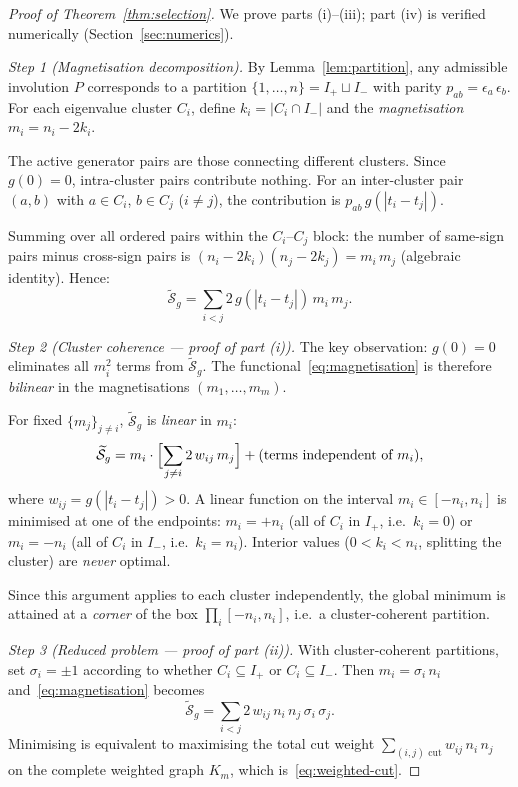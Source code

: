 \documentclass[11pt]{article}
\theoremstyle{plain}
\theoremstyle{definition}
\theoremstyle{remark}
\begin{document}
\begin{proof}[Proof of Theorem~\ref{thm:selection}]
We prove parts (i)--(iii); part (iv) is verified numerically
(Section~\ref{sec:numerics}).

\emph{Step 1 (Magnetisation decomposition).}
By Lemma~\ref{lem:partition}, any admissible involution $P$
corresponds to a partition $\{1, \ldots, n\} = I_+ \sqcup I_-$
with parity $p_{ab} = \epsilon_a\,\epsilon_b$.  For each eigenvalue
cluster $C_i$, define $k_i = |C_i \cap I_-|$ and the
\emph{magnetisation} $m_i = n_i - 2k_i$.

The active generator pairs are those connecting different clusters.
Since $g(0) = 0$, intra-cluster pairs contribute nothing.  For
an inter-cluster pair $(a, b)$ with $a \in C_i$, $b \in C_j$
($i \ne j$), the contribution is
$p_{ab}\,g(|t_i - t_j|)$.

Summing over all ordered pairs within the $C_i$--$C_j$ block:
the number of same-sign pairs minus cross-sign pairs is
$(n_i - 2k_i)(n_j - 2k_j) = m_i\,m_j$ (algebraic identity).
Hence:
\begin{equation}\label{eq:magnetisation}
  \widetilde{\mathcal{S}}_g
  = \sum_{i < j} 2\,g(|t_i - t_j|)\,m_i\,m_j.
\end{equation}

\emph{Step 2 (Cluster coherence --- proof of part (i)).}
The key observation: $g(0) = 0$ eliminates all $m_i^2$ terms from
$\widetilde{\mathcal{S}}_g$.  The functional~\eqref{eq:magnetisation}
is therefore \emph{bilinear} in the magnetisations $(m_1, \ldots, m_m)$.

For fixed $\{m_j\}_{j \ne i}$,
$\widetilde{\mathcal{S}}_g$ is \emph{linear} in $m_i$:
\[
  \widetilde{\mathcal{S}}_g
  = m_i \cdot \Bigl[\sum_{j \ne i} 2\,w_{ij}\,m_j\Bigr]
  + (\text{terms independent of } m_i),
\]
where $w_{ij} = g(|t_i - t_j|) > 0$.
A linear function on the interval $m_i \in [-n_i, n_i]$ is minimised
at one of the endpoints: $m_i = +n_i$ (all of $C_i$ in $I_+$, i.e.\
$k_i = 0$) or $m_i = -n_i$ (all of $C_i$ in $I_-$, i.e.\ $k_i = n_i$).
Interior values ($0 < k_i < n_i$, splitting the cluster) are
\emph{never} optimal.

Since this argument applies to each cluster independently, the
global minimum is attained at a \emph{corner} of the box
$\prod_i [-n_i, n_i]$, i.e.\ a cluster-coherent partition.

\emph{Step 3 (Reduced problem --- proof of part (ii)).}
With cluster-coherent partitions, set $\sigma_i = \pm 1$ according
to whether $C_i \subseteq I_+$ or $C_i \subseteq I_-$.  Then
$m_i = \sigma_i\,n_i$ and~\eqref{eq:magnetisation} becomes
\[
  \widetilde{\mathcal{S}}_g
  = \sum_{i < j} 2\,w_{ij}\,n_i\,n_j\,\sigma_i\,\sigma_j.
\]
Minimising is equivalent to maximising the total cut weight
$\sum_{(i,j) \text{ cut}} w_{ij}\,n_i\,n_j$ on the complete weighted
graph $K_m$, which is~\eqref{eq:weighted-cut}.


\end{proof}
\end{document}
